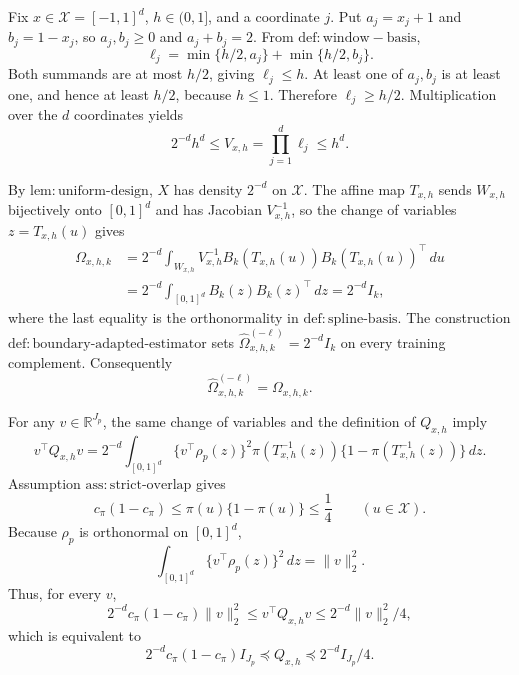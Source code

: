 Fix \(x\in\mathcal X=[-1,1]^d\), \(h\in(0,1]\), and a coordinate \(j\). Put \(a_j=x_j+1\) and \(b_j=1-x_j\), so \(a_j,b_j\ge0\) and \(a_j+b_j=2\). From \(\mathrm{def:window-basis}\),
\[
 \ell_j=\min\{h/2,a_j\}+\min\{h/2,b_j\}.
\]
Both summands are at most \(h/2\), giving \(\ell_j\le h\). At least one of \(a_j,b_j\) is at least one, and hence at least \(h/2\), because \(h\le1\). Therefore \(\ell_j\ge h/2\). Multiplication over the \(d\) coordinates yields
\[
 2^{-d}h^d\le V_{x,h}=\prod_{j=1}^d\ell_j\le h^d.
\]

By \(\mathrm{lem:uniform\text{-}design}\), \(X\) has density \(2^{-d}\) on \(\mathcal X\). The affine map \(T_{x,h}\) sends \(W_{x,h}\) bijectively onto \([0,1]^d\) and has Jacobian \(V_{x,h}^{-1}\), so the change of variables \(z=T_{x,h}(u)\) gives
\[
\begin{aligned}
 \Omega_{x,h,k}
 &=2^{-d}\int_{W_{x,h}}V_{x,h}^{-1}
 B_k(T_{x,h}(u))B_k(T_{x,h}(u))^\top\,du\\
 &=2^{-d}\int_{[0,1]^d}B_k(z)B_k(z)^\top\,dz
 =2^{-d}I_k,
\end{aligned}
\]
where the last equality is the orthonormality in \(\mathrm{def:spline\text{-}basis}\). The construction \(\mathrm{def:boundary\text{-}adapted\text{-}estimator}\) sets \(\widehat\Omega^{(-\ell)}_{x,h,k}=2^{-d}I_k\) on every training complement. Consequently
\[
 \widehat\Omega^{(-\ell)}_{x,h,k}=\Omega_{x,h,k}.
\]

For any \(v\in\mathbb R^{J_p}\), the same change of variables and the definition of \(Q_{x,h}\) imply
\[
 v^\top Q_{x,h}v
 =2^{-d}\int_{[0,1]^d}
 \{v^\top\rho_p(z)\}^2
 \pi(T_{x,h}^{-1}(z))\{1-\pi(T_{x,h}^{-1}(z))\}\,dz.
\]
Assumption \(\mathrm{ass:strict\text{-}overlap}\) gives
\[
 c_\pi(1-c_\pi)
 \le \pi(u)\{1-\pi(u)\}\le\frac14
 \qquad(u\in\mathcal X).
\]
Because \(\rho_p\) is orthonormal on \([0,1]^d\),
\[
 \int_{[0,1]^d}\{v^\top\rho_p(z)\}^2\,dz=\|v\|_2^2.
\]
Thus, for every \(v\),
\[
 2^{-d}c_\pi(1-c_\pi)\|v\|_2^2
 \le v^\top Q_{x,h}v
 \le 2^{-d}\|v\|_2^2/4,
\]
which is equivalent to
\[
 2^{-d}c_\pi(1-c_\pi)I_{J_p}
 \preceq Q_{x,h}
 \preceq 2^{-d}I_{J_p}/4.
\]

